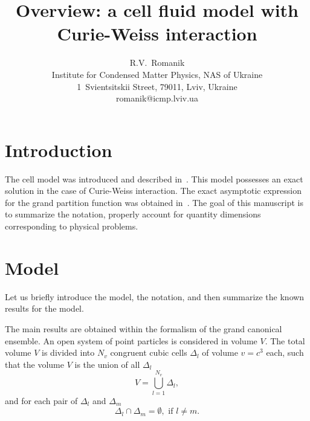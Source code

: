 \documentclass[12pt]{article}
\title{Overview: a cell fluid model with Curie-Weiss interaction}
\author{R.V.~Romanik
	\\ \small Institute for Condensed Matter Physics, NAS of Ukraine 
	\\ \small 1~Svientsitskii Street, 79011, Lviv, Ukraine 
	\\ \small romanik@icmp.lviv.ua}
\numberwithin{equation}{section}
\begin{document}
	
	\maketitle
	
	
	\section{Introduction}
	The cell model was introduced and described in~\cite{KKD18,KKD20}. This model possesses an exact solution in the case of Curie-Weiss interaction. The exact asymptotic expression for the grand partition function was obtained in~\cite{KKD20}.
	The goal of this manuscript is to summarize the notation, properly account for quantity dimensions corresponding to physical problems.
	
	\section{\label{sec:model} Model}
	Let us briefly introduce the model, the notation, and then summarize the known results for the model.
	
	The main results are obtained within the formalism of the grand canonical ensemble. An open system of point particles is considered in volume $V$. The total volume $V$ is divided into $N_v$ congruent cubic cells $\Delta_l$ of volume $v=c^3$ each, such that the volume $V$ is the union of all $\Delta_l$
	\begin{equation*}
		V = \bigcup_{l=1}^{N_v}\Delta_l,
	\end{equation*}
	and for each pair of $\Delta_l$ and $\Delta_m$
	\begin{equation*}
		\Delta_l \cap \Delta_m = \emptyset, \text{ if } l \neq m.
	\end{equation*}
	
\end{document}
